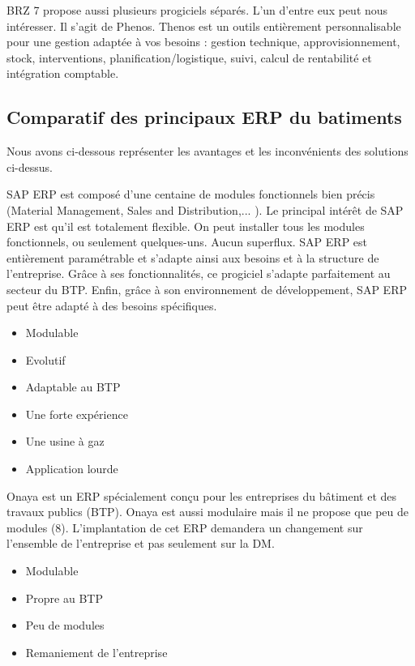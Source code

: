 		BRZ 7 propose aussi plusieurs progiciels séparés. L'un d'entre eux peut nous intéresser. Il s'agit de Phenos.
    Thenos est un outils entièrement personnalisable pour une gestion adaptée à vos besoins : 
    gestion technique, approvisionnement, stock, interventions, planification/logistique, suivi, calcul de rentabilité et intégration comptable. 
		  
		
\subsection{Comparatif des principaux ERP du batiments}

Nous avons ci-dessous représenter les avantages et les inconvénients des solutions ci-dessus.


{
    SAP ERP est composé d'une centaine de modules fonctionnels bien précis (Material Management, Sales and Distribution,... ).
    Le principal intérêt de SAP ERP est qu'il est totalement flexible. On peut installer tous les modules fonctionnels, ou seulement quelques-uns.
    Aucun superflux. SAP ERP est entièrement paramétrable et s'adapte ainsi aux besoins et à la structure de l'entreprise.
    Grâce à ses fonctionnalités, ce progiciel s'adapte parfaitement au secteur du BTP.
    Enfin, grâce à son environnement de développement, SAP ERP peut être adapté à des besoins spécifiques.
}
{
    \begin{itemize}
        \item Modulable
        \item Evolutif
        \item Adaptable au BTP
        \item Une forte expérience
    \end{itemize}
}
{
    \begin{itemize}
        \item Une usine à gaz
        \item Application lourde
    \end{itemize}
}

 
 
{
    Onaya est un ERP spécialement conçu pour les entreprises du bâtiment et des travaux publics (BTP).
    Onaya est aussi modulaire mais il ne propose que peu de modules (8).
    L'implantation de cet ERP demandera un changement sur l'ensemble de l'entreprise et pas seulement sur la DM.
}
{
    \begin{itemize}
        \item Modulable
        \item Propre au BTP
    \end{itemize}
}
{
    \begin{itemize}
        \item Peu de modules
        \item Remaniement de l'entreprise
    \end{itemize}
}


